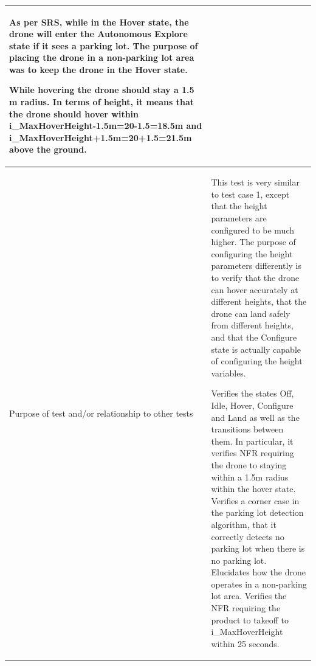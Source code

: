 \documentclass[12pt, titlepage]{article}
\begin{document}
\begin{table}[!h]
\begin{center}
\begin{tabular}{ | m{1.5cm} | m{15cm} | }
As per SRS, while in the Hover state, the drone will enter the Autonomous Explore state if it sees a parking lot. The purpose of placing the drone in a non-parking lot area was to keep the drone in the Hover state.

While hovering the drone should stay a 1.5 m radius. In terms of height, it means that the drone should hover within i\_MaxHoverHeight-1.5m=20-1.5=18.5m and i\_MaxHoverHeight+1.5m=20+1.5=21.5m above the ground.  \\ 
\hline
Purpose of test and/or relationship to other tests & This test is very similar to test case 1, except that the height parameters are configured to be much higher. The purpose of configuring the height parameters differently is to verify that the drone can hover accurately at different heights, that the drone can land safely from different heights, and that the Configure state is actually capable of configuring the height variables.

Verifies the states Off, Idle, Hover, Configure and Land as well as the transitions between them. In particular, it verifies NFR requiring the drone to staying within a 1.5m radius within the hover state. 
Verifies a corner case in the parking lot detection algorithm, that it correctly detects no parking lot when there is no parking lot.
Elucidates how the drone operates in a non-parking lot area.
Verifies the NFR requiring the product to takeoff to i\_MaxHoverHeight within 25 seconds. \\ 
\hline
\end{tabular}
\end{center}
\end{table}
\end{document}
